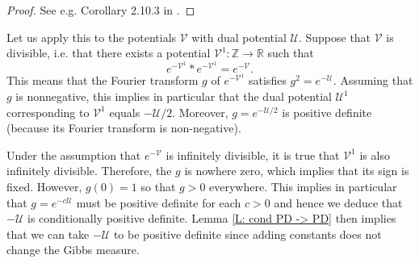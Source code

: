 \documentclass[11pt, reqno]{amsart}
\numberwithin{equation}{section}
\theoremstyle{definition}
\theoremstyle{remark}
\newcommand{\ZZ}{\mathbb{Z}}
\newcommand{\RR}{\mathbb{R}}
\renewcommand{\c}[1]{\ensuremath{\mathcal{#1}}}
\begin{document}
\begin{proof}
	See e.g. Corollary 2.10.3 in \cite{BdlHV}. 
\end{proof}

Let us apply this to the potentials $\c{V}$ with dual potential $\c{U}$. Suppose that $\c{V}$ is divisible, i.e. that there exists a potential $\c{V}^{1}:\ZZ \to \RR$ such that
	\[
		e^{-\c{V}^1} * e^{-\c{V}^1} = e^{-\c{V}}. 
	\]
	This means that the Fourier transform $g$ of $e^{-\c{V}^1}$ satisfies $g^2 = e^{-\mathcal U}$. Assuming that $g$ is nonnegative, this implies in particular that the dual potential $\c{U}^{1}$ corresponding to $\c{V}^{1}$ equals $-\c{U}/2$. Moreover, $g = e^{-\c{U}/2}$ is positive definite (because its Fourier transform is non-negative). 
	
	Under the assumption that $e^{-\c{V}}$ is infinitely divisible, it is true that $\c{V}^1$ is also infinitely divisible. 
	Therefore, the $g$ is nowhere zero, which implies that its sign is fixed. However, $g(0) = 1$ so that $g > 0$ everywhere. 
	This implies in particular that $g = e^{-c \c{U}}$ must be positive definite for each $c > 0$ and hence we deduce that $-\c{U}$ is conditionally positive definite. 
	Lemma \ref{L: cond PD -> PD} then implies that we can take $-\c{U}$ to be positive definite since adding constants does not change the Gibbs measure. 








\end{document}
